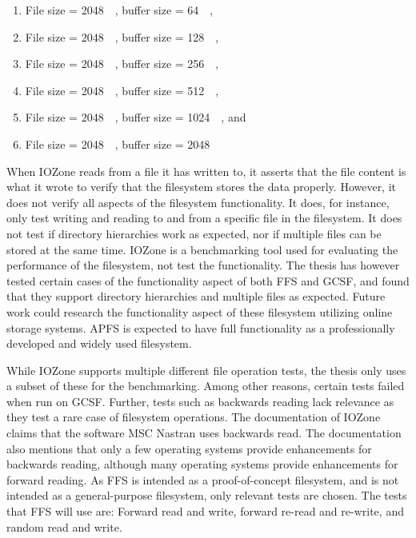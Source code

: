 \begin{enumerate}
\begin{enumerate}
	\item File size = \SI{2048}{\kilo\byte}, buffer size = \SI{64}{\kilo\byte},
	\item File size = \SI{2048}{\kilo\byte}, buffer size = \SI{128}{\kilo\byte},
	\item File size = \SI{2048}{\kilo\byte}, buffer size = \SI{256}{\kilo\byte},
	\item File size = \SI{2048}{\kilo\byte}, buffer size = \SI{512}{\kilo\byte},
	\item File size = \SI{2048}{\kilo\byte}, buffer size = \SI{1024}{\kilo\byte}, and
	\item File size = \SI{2048}{\kilo\byte}, buffer size = \SI{2048}{\kilo\byte}
\end{enumerate}

When IOZone reads from a file it has written to, it asserts that the file content is what it wrote to verify that the filesystem stores the data properly. However, it does not verify all aspects of the filesystem functionality. It does, for instance, only test writing and reading to and from a specific file in the filesystem. It does not test if directory hierarchies work as expected, nor if multiple files can be stored at the same time. IOZone is a benchmarking tool used for evaluating the performance of the filesystem, not test the functionality. The thesis has however tested certain cases of the functionality aspect of both FFS and GCSF, and found that they support directory hierarchies and multiple files as expected. Future work could research the functionality aspect of these filesystem utilizing online storage systems. APFS is expected to have full functionality as a professionally developed and widely used filesystem.

While IOZone supports multiple different file operation tests, the thesis only uses a subset of these for the benchmarking. Among other reasons, certain tests failed when run on GCSF. Further, tests such as backwards reading lack relevance as they test a rare case of filesystem operations. The documentation of IOZone\,\cite{iozoneIozoneFilesystemBenchmark} claims that the software MSC Nastran uses backwards read. The documentation also mentions that only a few operating systems provide enhancements for backwards reading, although many operating systems provide enhancements for forward reading. As FFS is intended as a proof-of-concept filesystem, and is not intended as a general-purpose filesystem, only relevant tests are chosen. The tests that FFS will use are: Forward read and write, forward re-read and re-write, and random read and write.


\end{enumerate}
